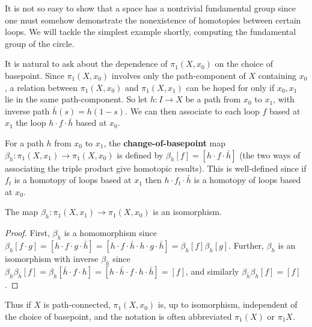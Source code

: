 It is not so easy to show that a space has a nontrivial fundamental group since one
must somehow demonstrate the nonexistence of homotopies between certain loops.
We will tackle the simplest example shortly, computing the fundamental group of
the circle.

It is natural to ask about the dependence of $\pi_1(X,x_0)$ on the choice of basepoint.
Since $\pi_1(X,x_0)$ involves only the path-component of $X$ containing $x_0$, a relation
between $\pi_1(X,x_0)$ and $\pi_1(X,x_1)$ can be hoped for only if $x_0,x_1$ lie in the same
path-component. So let $h : I \to X$ be a path from $x_0$ to $x_1$, with inverse path
$\bar h(s) = h(1-s)$. We can then associate to each loop $f$ based at $x_1$ the loop
$h \cdot f \cdot \bar h$ based at $x_0$.



\begin{definition}
\label{def:change-of-basepoint-map}
For a path $h$ from $x_0$ to $x_1$, the \textbf{change-of-basepoint} map
$\beta_h : \pi_1(X,x_1) \to \pi_1(X,x_0)$ is defined by $\beta_h[f] = [h \cdot f \cdot \bar h]$ (the two ways of
associating the triple product give homotopic results). This is well-defined since if
$f_t$ is a homotopy of loops based at $x_1$ then $h \cdot f_t \cdot \bar h$ is a homotopy of loops
based at $x_0$.
\end{definition}

\begin{proposition}
\label{prop:change-of-basepoint-isomorphism}
The map $\beta_h : \pi_1(X,x_1) \to \pi_1(X,x_0)$ is an isomorphism.
\end{proposition}

\begin{proof}
First, $\beta_h$ is a homomorphism since $\beta_h[f\cdot g] = [h\cdot f\cdot g\cdot\bar h]
= [h\cdot f\cdot\bar h\cdot h\cdot g\cdot\bar h] = \beta_h[f]\beta_h[g]$. Further, $\beta_h$ is an isomorphism with
inverse $\beta_{\bar h}$ since $\beta_h\beta_{\bar h}[f] = \beta_h[\bar h\cdot f\cdot h] = [h\cdot\bar h\cdot f\cdot h\cdot\bar h] = [f]$, and
similarly $\beta_{\bar h}\beta_h[f]=[f]$.
\end{proof}

Thus if $X$ is path-connected, $\pi_1(X,x_0)$ is, up to isomorphism, independent of the
choice of basepoint, and the notation is often abbreviated $\pi_1(X)$ or $\pi_1 X$.

